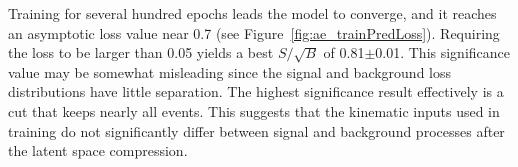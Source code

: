 Training for several hundred epochs leads the model to converge, and it reaches an asymptotic loss value near 0.7 (see Figure~\ref{fig:ae_trainPredLoss}). Requiring the loss to be larger than 0.05 yields a best $S/\sqrt{B}$ of 0.81$\pm$0.01. This significance value may be somewhat misleading since the signal and background loss distributions have little separation. The highest significance result effectively is a cut that keeps nearly all events. This suggests that the kinematic inputs used in training do not significantly differ between signal and background processes after the latent space compression.

